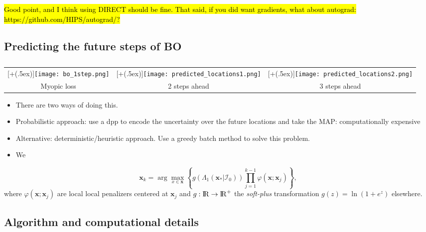 \documentclass[twoside]{article}
\def\bbbr{{\rm I\!R}}
\newcommand{\I}{\mathcal{I}}
\newcommand{\bx}{\textbf{x}}
\newcommand*{\addheight}[2][.5ex]{%
  \raisebox{0pt}[\dimexpr\height+(#1)\relax]{#2}%
}
\begin{document}
\hl{
    Good point, and I think using DIRECT should be fine. That said, if you did want gradients, what about autograd: https://github.com/HIPS/autograd/?
}


\subsection{Predicting the future steps of BO}

\begin{table*}[t!]
\begin{tabular}{ccc}
      \addheight{\texttt{[image: bo\_1step.png]}} &
      \addheight{\texttt{[image: predicted\_locations1.png]}}  &
      \addheight{\texttt{[image: predicted\_locations2.png]}}\\
      \small Myopic loss &  \small 2 steps ahead & \small 3 steps ahead \\
\end{tabular}\caption{}
\end{table*}

\begin{itemize}
\item There are two ways of doing this.
\item Probabilistic approach: use a dpp to encode the uncertainty over the future locations and take the MAP: computationally expensive
\item Alternative: deterministic/heuristic approach. Use a greedy batch method to solve this problem.
\item We 
\end{itemize}

\begin{equation}\label{eq:penalized_acquisition}
\bx_{k} =\arg \max_{x \in \bx} \left\{g(\Lambda_1(\bx_*| \I_0))\prod_{j=1}^{k-1}\varphi(\bx;\bx_{j})\right\},
\end{equation}
where $\varphi(\bx;\bx_{j})$ are local local penalizers centered at $\bx_{j}$ and $g:\bbbr \rightarrow \bbbr^+$  the \emph{soft-plus} transformation $g(z)= \ln(1+e^z)$ elsewhere.


\subsection{Algorithm and computational details}
\end{document}

